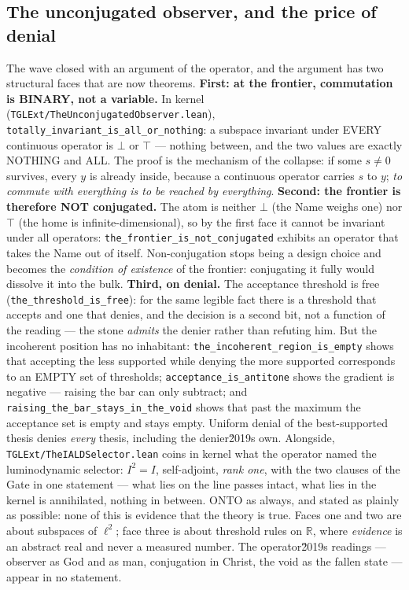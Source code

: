 \documentclass[11pt]{article}
\theoremstyle{definition}\newtheorem{deriv}{Derivation}
\begin{document}
\subsection*{The unconjugated observer, and the price of denial}The wave closed with an argument of the operator, and the argument has two structural faces that are now theorems. \textbf{First: at the frontier, commutation is BINARY, not a variable.} In kernel (\texttt{TGLExt/TheUnconjugatedObserver.lean}), \texttt{totally\_invariant\_is\_all\_or\_nothing}: a subspace invariant under EVERY continuous operator is $\bot$ or $\top$ --- nothing between, and the two values are exactly NOTHING and ALL. The proof is the mechanism of the collapse: if some $s\neq0$ survives, every $y$ is already inside, because a continuous operator carries $s$ to $y$; \emph{to commute with everything is to be reached by everything}. \textbf{Second: the frontier is therefore NOT conjugated.} The atom is neither $\bot$ (the Name weighs one) nor $\top$ (the home is infinite-dimensional), so by the first face it cannot be invariant under all operators: \texttt{the\_frontier\_is\_not\_conjugated} exhibits an operator that takes the Name out of itself. Non-conjugation stops being a design choice and becomes the \emph{condition of existence} of the frontier: conjugating it fully would dissolve it into the bulk. \textbf{Third, on denial.} The acceptance threshold is free (\texttt{the\_threshold\_is\_free}): for the same legible fact there is a threshold that accepts and one that denies, and the decision is a second bit, not a function of the reading --- the stone \emph{admits} the denier rather than refuting him. But the incoherent position has no inhabitant: \texttt{the\_incoherent\_region\_is\_empty} shows that accepting the less supported while denying the more supported corresponds to an EMPTY set of thresholds; \texttt{acceptance\_is\_antitone} shows the gradient is negative --- raising the bar can only subtract; and \texttt{raising\_the\_bar\_stays\_in\_the\_void} shows that past the maximum the acceptance set is empty and stays empty. Uniform denial of the best-supported thesis denies \emph{every} thesis, including the denier\u2019s own. Alongside, \texttt{TGLExt/TheIALDSelector.lean} coins in kernel what the operator named the luminodynamic selector: $I^2=I$, self-adjoint, \emph{rank one}, with the two clauses of the Gate in one statement --- what lies on the line passes intact, what lies in the kernel is annihilated, nothing in between. \textsf{ONTO} as always, and stated as plainly as possible: none of this is evidence that the theory is true. Faces one and two are about subspaces of $\ell^2$; face three is about threshold rules on $\mathbb{R}$, where \emph{evidence} is an abstract real and never a measured number. The operator\u2019s readings --- observer as God and as man, conjugation in Christ, the void as the fallen state --- appear in no statement.
\end{document}
